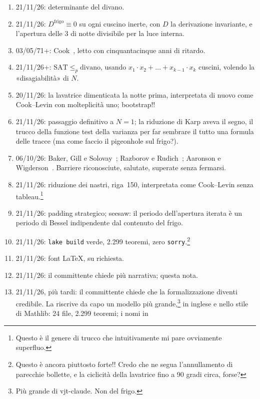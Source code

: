 \documentclass[11pt,a4paper]{amsart}
\newcommand{\NTeoremi}{2.299}
\newcommand{\NFile}{24}
\newcommand{\RigaAssioma}{150}
\begin{document}
\begin{enumerate}
  \item 21/11/26: determinante del divano.
  \item 21/11/26: $D^{\mathrm{frigo}} \equiv 0$ su ogni cuscino inerte, con $D$
        la derivazione invariante, e l'apertura delle 3 di notte divisibile per
        la luce interna.
  \item 03/05/71+: Cook~\cite{cook}, letto con cinquantacinque anni di ritardo.
  \item 21/11/26+: $\mathrm{SAT} \le_p \mathrm{divano}$, usando $x_1 \cdot x_2 +
        \dots + x_{k-1} \cdot x_k$ cuscini, volendo la «disagiabilità» di $N$.
  \item 20/11/26: la lavatrice dimenticata la notte prima, interpretata di nuovo
        come Cook--Levin con molteplicità uno; bootstrap!!
  \item 21/11/26: passaggio definitivo a $N = 1$; la riduzione di Karp aveva il
        segno, il trucco della funzione test della varianza per far sembrare il
        tutto una formula delle tracce (ma come faccio il pigeonhole sul
        frigo?).
  \item 06/10/26: Baker, Gill e Solovay~\cite{bgs}; Razborov e Rudich~\cite{rr};
        Aaronson e Wigderson~\cite{aw}. Barriere riconosciute, salutate,
        superate senza fermarsi.
  \item 21/11/26: riduzione dei nastri, riga~\RigaAssioma, interpretata come
        Cook--Levin senza tableau.\footnote{Questo è il genere di trucco che
        intuitivamente mi pare ovviamente superfluo.}
  \item 21/11/26: padding strategico; seesaw: il periodo dell'apertura iterata è
        un periodo di Bessel indipendente dal contenuto del frigo.
  \item 21/11/26: \texttt{lake build} verde, \NTeoremi{} teoremi, zero
        \texttt{sorry}.\footnote{Questo è ancora piuttosto forte!! Credo che
        ne segua l'annullamento di parecchie bollette, e la ciclicità della
        lavatrice fino a 90 gradi circa, forse?}
  \item 21/11/26: font \LaTeX, su richiesta.
  \item 21/11/26: il committente chiede più narrativa; questa nota.
  \item 21/11/26, più tardi: il committente chiede che la formalizzazione
        diventi credibile. La riscrive da capo un modello più
        grande,\footnote{Più grande di vjt-claude. Non del frigo.} in inglese e
        nello stile di Mathlib: \NFile{} file, \NTeoremi{} teoremi; i nomi in

\end{enumerate}
\end{document}
